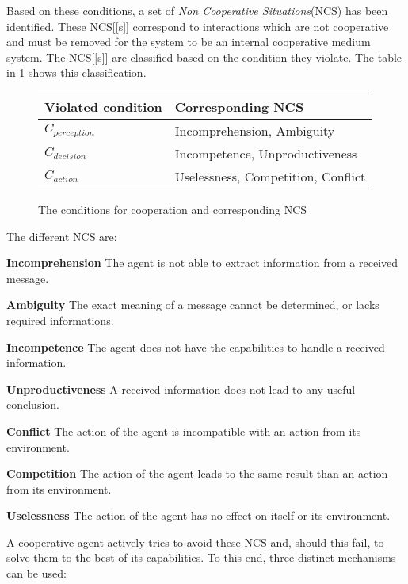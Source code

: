 Based on these conditions, a set of \emph{Non Cooperative Situations}(NCS) has been identified. These NCS[[s]] correspond to interactions which are not cooperative and must be removed for the system to be an internal cooperative medium system. The NCS[[s]] are classified based on the condition they violate. The table in \figurename{} \ref{NCS} shows this classification.

\begin{figure}
\centering
\begin{tabular}{ll}
\toprule
\textbf{Violated condition}	& \textbf{Corresponding NCS} \\
\midrule
$C_{perception}$     & Incomprehension, Ambiguity\\

$C_{decision}$      & Incompetence, Unproductiveness \\

$C_{action}$     & Uselessness, Competition, Conflict\\
\bottomrule
\end{tabular}
\caption{The conditions for cooperation and corresponding NCS}
\label{NCS}
\end{figure}

The different NCS are:
\begin{compactitem}
\item\textbf{Incomprehension} The agent is not able to extract information from a received message.
\item\textbf{Ambiguity} The exact meaning of a message cannot be determined, or lacks required informations.
\item\textbf{Incompetence} The agent does not have the capabilities to handle a received information.
\item\textbf{Unproductiveness} A received information does not lead to any useful conclusion.
\item\textbf{Conflict} The action of the agent is incompatible with an action from its environment.
\item\textbf{Competition} The action of the agent leads to the same result than an action from its environment.
\item\textbf{Uselessness} The action of the agent has no effect on itself or its environment.
\end{compactitem}

A cooperative agent actively tries to avoid these NCS and, should this fail, to solve them to the best of its capabilities. To this end, three distinct mechanisms can be used\cite{bonjean2009engineering}:


